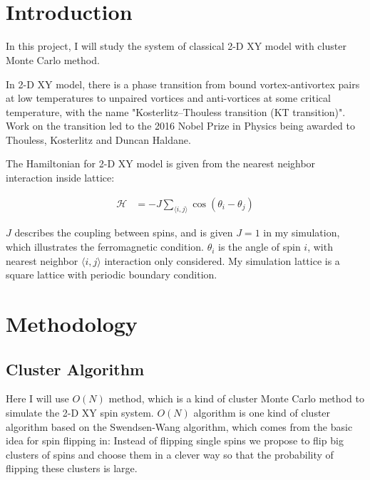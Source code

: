 \documentclass[a4paper]{article}
\title{
\vspace{2in}
\textmd{\textbf{\hmwkTitle}}\\
\vspace{3in}
}
\author{\textbf{\hmwkAuthorName}}
\date{} %
\begin{document}
\maketitle
\newpage

\section{Introduction}

In this project, I will study the system of classical 2-D XY model with cluster Monte Carlo method.

In 2-D XY model, there is a phase transition from bound vortex-antivortex pairs at low temperatures to unpaired vortices and anti-vortices at some critical temperature, with the name "Kosterlitz–Thouless transition (KT transition)"\cite{kosterlitz1973ordering}. Work on the transition led to the 2016 Nobel Prize in Physics being awarded to Thouless, Kosterlitz and Duncan Haldane.

The Hamiltonian for 2-D XY model is given from the nearest neighbor interaction inside lattice:

\begin{align*}
\mathcal{H} &= -J\displaystyle \sum_{\langle i,j\rangle} \cos{(\theta_i - \theta_j)}
\end{align*}

$J$ describes the coupling between spins, and is given $J = 1$ in my simulation, which illustrates the ferromagnetic condition. $\theta_i$ is the angle of spin $i$, with nearest neighbor $\langle i,j\rangle$ interaction only considered. My simulation lattice is a square lattice with periodic boundary condition.

\section{Methodology}

\subsection{Cluster Algorithm}

Here I will use $O(N)$ method, which is a kind of cluster Monte Carlo method to simulate the 2-D XY spin system. $O(N)$ algorithm is one kind of cluster algorithm based on the Swendsen-Wang algorithm, which comes from the basic idea for spin flipping in: Instead of flipping single spins we propose to flip big clusters of spins and choose them in a clever way so that the probability of flipping these clusters is large.
\end{document}
